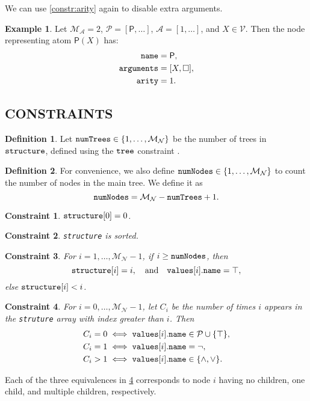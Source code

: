 \documentclass[letterpaper]{article}
\newtheorem{constraint}{Constraint}
\theoremstyle{definition}
\newtheorem{definition}{Definition}
\newtheorem{example}{Example}
\newcommand{\variable}[1]{\texttt{\textup{#1}}}
\newcommand{\predicates}{\mathcal{P}}
\newcommand{\variables}{\mathcal{V}}
\newcommand{\arities}{\mathcal{A}}
\newcommand{\maxArity}{\mathcal{M}_{\mathcal{A}}}
\newcommand{\maxNumNodes}{\mathcal{M}_{\mathcal{N}}}
\begin{document}
We can use \cref{constr:arity} again to disable extra arguments.

\begin{example}
  Let $\maxArity{} = 2$, $\predicates{} = [\mathsf{P}, \dots]$, $\arities{}
  = [1, \dots]$, and $X \in \variables{}$. Then the node representing atom
  $\mathsf{P}(X)$ has:
  \begin{align*}
    \variable{name} &= \mathsf{P},\\
    \variable{arguments} &= [X, \Box],\\
    \variable{arity} &= 1.
  \end{align*}
\end{example}

\subsection{CONSTRAINTS}

\begin{definition}
  Let $\variable{numTrees} \in \{ 1, \dots, \maxNumNodes{} \}$ be the number of
  trees in $\variable{structure}$, defined using the $\variable{tree}$
  constraint \citep{DBLP:conf/cp/FagesL11}.
\end{definition}

\begin{definition}
  For convenience, we also define $\variable{numNodes} \in \{ 1, \dots,
  \maxNumNodes{} \}$ to count the number of nodes in the main tree. We define it
  as
  \[
    \variable{numNodes} = \maxNumNodes{} - \variable{numTrees} + 1.
  \]
\end{definition}

\begin{constraint}
  $\variable{structure}[0] = 0$.
\end{constraint}

\begin{constraint}
  \variable{structure} is sorted.
\end{constraint}

\begin{constraint}
  For $i = 1, \dots, \maxNumNodes{} - 1$, if $i \ge \variable{numNodes}$, then
  \[
    \variable{structure}[i] = i, \quad \text{and} \quad
    \variable{values}[i].\variable{name} = \top,
  \]
  else $\variable{structure}[i] < i$.
\end{constraint}

\begin{constraint} \label{constraint:node_types}
  For $i = 0, \dots, \maxNumNodes{} - 1$, let $C_i$ be the number of times $i$
  appears in the \variable{struture} array with index greater than $i$. Then
  \begin{align*}
    C_i = 0 &\iff \variable{values}[i].\variable{name} \in \predicates{} \cup \{ \top \},\\
    C_i = 1 &\iff \variable{values}[i].\variable{name} = \neg,\\
    C_i > 1 &\iff \variable{values}[i].\variable{name} \in \{ \land, \lor \}.
  \end{align*}
\end{constraint}
Each of the three equivalences in \cref{constraint:node_types} corresponds to
node $i$ having no children, one child, and multiple children, respectively.
\end{document}
